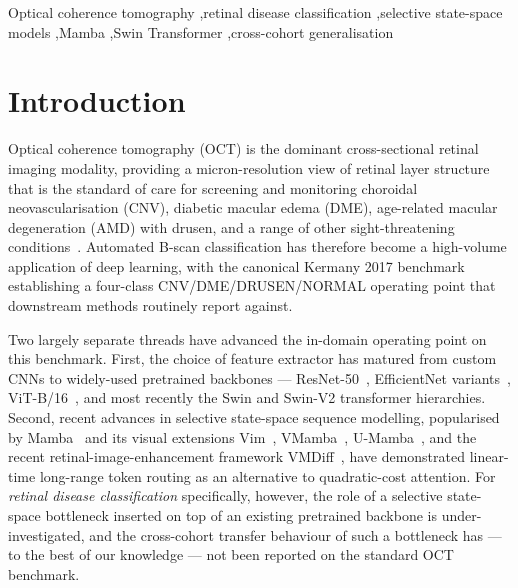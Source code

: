\documentclass[5p]{elsarticle}
\begin{document}
\begin{frontmatter}
\begin{keyword}
Optical coherence tomography \sep retinal disease classification \sep selective state-space models \sep Mamba \sep Swin Transformer \sep cross-cohort generalisation
\end{keyword}

\end{frontmatter}


\section{Introduction}
\label{sec:intro}
Optical coherence tomography (OCT) is the dominant cross-sectional retinal imaging modality, providing a micron-resolution view of retinal layer structure that is the standard of care for screening and monitoring choroidal neovascularisation (CNV), diabetic macular edema (DME), age-related macular degeneration (AMD) with drusen, and a range of other sight-threatening conditions~\citep{kermany2018identifying,rasti2018macular,li2019deep}. Automated B-scan classification has therefore become a high-volume application of deep learning, with the canonical Kermany 2017 benchmark~\citep{kermany2018identifying} establishing a four-class CNV/DME/DRUSEN/NORMAL operating point that downstream methods routinely report against.

Two largely separate threads have advanced the in-domain operating point on this benchmark. First, the choice of feature extractor has matured from custom CNNs to widely-used pretrained backbones --- ResNet-50~\citep{he2016resnet}, EfficientNet variants~\citep{tan2019efficientnet}, ViT-B/16~\citep{dosovitskiy2021}, and most recently the Swin and Swin-V2 transformer hierarchies. Second, recent advances in selective state-space sequence modelling, popularised by Mamba~\citep{gu2023mamba} and its visual extensions Vim~\citep{zhu2024vim}, VMamba~\citep{liu2024vmamba}, U-Mamba~\citep{ma2024umamba}, and the recent retinal-image-enhancement framework VMDiff~\citep{chan2026vmdiff}, have demonstrated linear-time long-range token routing as an alternative to quadratic-cost attention. For \emph{retinal disease classification} specifically, however, the role of a selective state-space bottleneck inserted on top of an existing pretrained backbone is under-investigated, and the cross-cohort transfer behaviour of such a bottleneck has --- to the best of our knowledge --- not been reported on the standard OCT benchmark.
\end{document}
